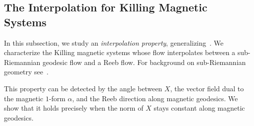 \documentclass[11pt,reqno]{amsart}
\theoremstyle{plain}
\theoremstyle{definition}
\numberwithin{equation}{section}
\begin{document}
\subsection{The Interpolation for Killing Magnetic Systems}
\label{section: Interpolation Property for Killing Magnetic Systems}

%

In this subsection, we study an \emph{interpolation property}, generalizing~\cite[Cor.~1.8]{ABM}. We characterize the Killing magnetic systems whose flow interpolates between a sub-Riemannian geodesic flow and a Reeb flow. For background on sub-Riemannian geometry see~\cite{Montgomereysubriembook}.

This property can be detected by the angle between $X$, the vector field dual to the magnetic $1$-form $\alpha$, and the Reeb direction along magnetic geodesics. We show that it holds precisely when the norm of $X$ stays constant along magnetic geodesics.
\end{document}
